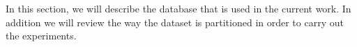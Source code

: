 In this section, we will describe the database that is used in the current work. In addition we
will review the way the dataset is partitioned in order to carry out the experiments.